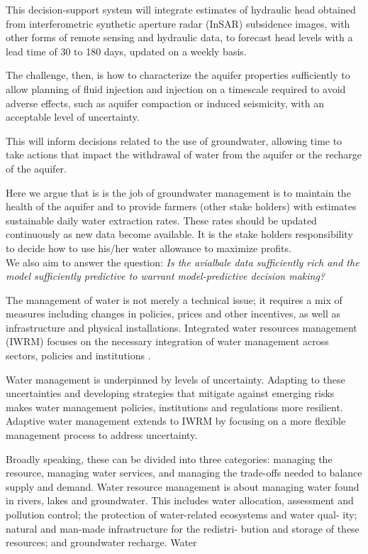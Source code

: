 \documentclass[11pt,final]{article}%
\begin{document}
This decision-support system will integrate estimates of hydraulic head obtained from interferometric synthetic aperture radar (InSAR) subsidence images, with other forms of remote sensing and hydraulic data, to forecast head levels with a lead time of 30 to 180 days, updated on a weekly basis. 


The challenge, then, is how to characterize the aquifer properties sufficiently to allow planning of fluid injection and injection on a timescale required to avoid adverse effects, such as aquifer compaction or induced seismicity, with an acceptable level of uncertainty. 

This will inform decisions related to the use of groundwater, allowing time to take actions that impact the withdrawal of water from the aquifer or the recharge of the aquifer. 

Here we argue that is is the job of groundwater management is to maintain the health of the aquifer and to provide farmers (other stake holders) with estimates sustainable daily water extraction rates. These rates should be updated continuously as new data become available. It is the stake holders responsibility to decide how to use his/her water allowance to maximize profits.\\

We also aim to answer the question: \emph{Is the avialbale data sufficiently rich and the model sufficiently predictive to warrant model-predictive decision making?}

The management of water is not merely a technical issue; it requires a mix of measures including changes in policies, prices and other incentives, as well as infrastructure and physical installations. Integrated water resources management (IWRM) focuses on the necessary integration of water management across sectors, policies and institutions \cite{UNESCO2012}.

Water management is underpinned by levels of uncertainty. Adapting to these uncertainties and developing strategies that mitigate against emerging risks makes water management policies, institutions and regulations more resilient. Adaptive water management extends to IWRM by focusing on a more flexible management process to address uncertainty.

Broadly speaking, these can be divided into three categories: managing the resource, managing water services, and managing the trade-offs needed to balance supply and demand. Water resource management is about managing water found in rivers, lakes and groundwater. This includes water allocation, assessment and pollution control; the protection of water-related ecosystems and water qual- ity; natural and man-made infrastructure for the redistri- bution and storage of these resources; and groundwater recharge. Water
\end{document}
